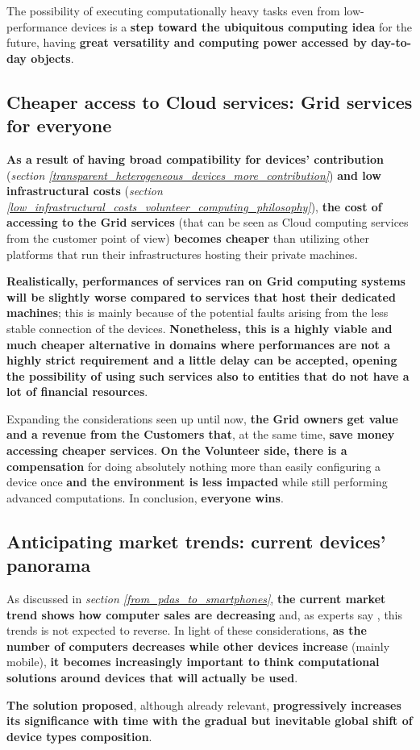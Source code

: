 The possibility of executing computationally heavy tasks even from low-performance devices is a \textbf{step toward the ubiquitous computing idea} for the future, having \textbf{great versatility and computing power accessed by day-to-day objects}.

\subsection{Cheaper access to Cloud services: Grid services for everyone}\label{cheaper_access_to_cloud_services}
\textbf{As a result of having broad compatibility for devices' contribution} (\textit{section \ref{transparent_heterogeneous_devices_more_contribution}}) \textbf{and low infrastructural costs} (\textit{section \ref{low_infrastructural_costs_volunteer_computing_philosophy}}), \textbf{the cost of accessing to the Grid services} (that can be seen as Cloud computing services from the customer point of view) \textbf{becomes cheaper} than utilizing other platforms that run their infrastructures hosting their private machines.

\textbf{Realistically, performances of services ran on Grid computing systems will be slightly worse compared to services that host their dedicated machines}; this is mainly because of the potential faults arising from the less stable connection of the devices. \textbf{Nonetheless, this is a highly viable and much cheaper alternative in domains where performances are not a highly strict requirement and a little delay can be accepted, opening the possibility of using such services also to entities that do not have a lot of financial resources}.

\vspace{10mm}
Expanding the considerations seen up until now, \textbf{the Grid owners get value and a revenue from the Customers that}, at the same time, \textbf{save money accessing cheaper services}. \textbf{On the Volunteer side, there is a compensation} for doing absolutely nothing more than easily configuring a device once \textbf{and the environment is less impacted} while still performing advanced computations. In conclusion, \textbf{everyone wins}. 

\subsection{Anticipating market trends: current devices' panorama}
As discussed in \textit{section \ref{from_pdas_to_smartphones}}, \textbf{the current market trend shows how computer sales are decreasing} and, as experts say \cite{smartphones_sales}, this trends is not expected to reverse. In light of these considerations, \textbf{as the number of computers decreases while other devices increase} (mainly mobile), \textbf{it becomes increasingly important to think computational solutions around devices that will actually be used}.

\textbf{The solution proposed}, although already relevant, \textbf{progressively increases its significance with time with the gradual but inevitable global shift of device types composition}.
